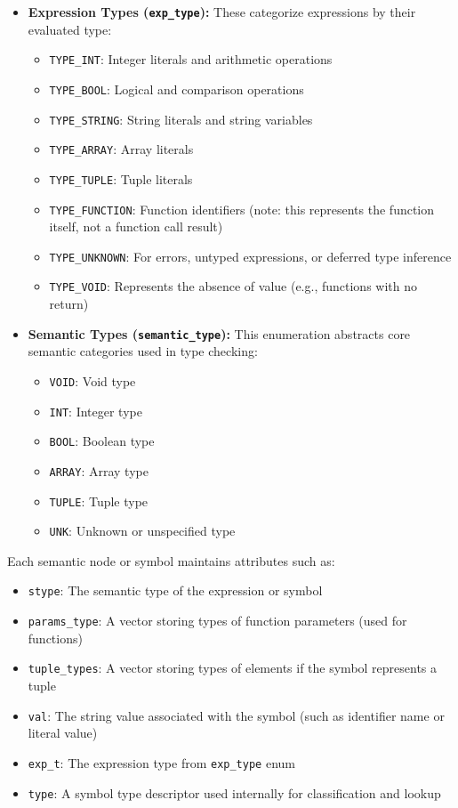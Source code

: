 \documentclass[12pt, a4paper]{report}
\begin{document}
\begin{itemize}
    \item \textbf{Expression Types (\texttt{exp\_type}):}  
    These categorize expressions by their evaluated type:
    \begin{itemize}
        \item \texttt{TYPE\_INT}: Integer literals and arithmetic operations
        \item \texttt{TYPE\_BOOL}: Logical and comparison operations
        \item \texttt{TYPE\_STRING}: String literals and string variables
        \item \texttt{TYPE\_ARRAY}: Array literals
        \item \texttt{TYPE\_TUPLE}: Tuple literals
        \item \texttt{TYPE\_FUNCTION}: Function identifiers (note: this represents the function itself, not a function call result)
        \item \texttt{TYPE\_UNKNOWN}: For errors, untyped expressions, or deferred type inference
        \item \texttt{TYPE\_VOID}: Represents the absence of value (e.g., functions with no return)
    \end{itemize}

    \item \textbf{Semantic Types (\texttt{semantic\_type}):}  
    This enumeration abstracts core semantic categories used in type checking:
    \begin{itemize}
        \item \texttt{VOID}: Void type
        \item \texttt{INT}: Integer type
        \item \texttt{BOOL}: Boolean type
        \item \texttt{ARRAY}: Array type
        \item \texttt{TUPLE}: Tuple type
        \item \texttt{UNK}: Unknown or unspecified type
    \end{itemize}
\end{itemize}

Each semantic node or symbol maintains attributes such as:

\begin{itemize}
    \item \texttt{stype}: The semantic type of the expression or symbol
    \item \texttt{params\_type}: A vector storing types of function parameters (used for functions)
    \item \texttt{tuple\_types}: A vector storing types of elements if the symbol represents a tuple
    \item \texttt{val}: The string value associated with the symbol (such as identifier name or literal value)
    \item \texttt{exp\_t}: The expression type from \texttt{exp\_type} enum
    \item \texttt{type}: A symbol type descriptor used internally for classification and lookup
\end{itemize}
\end{document}
